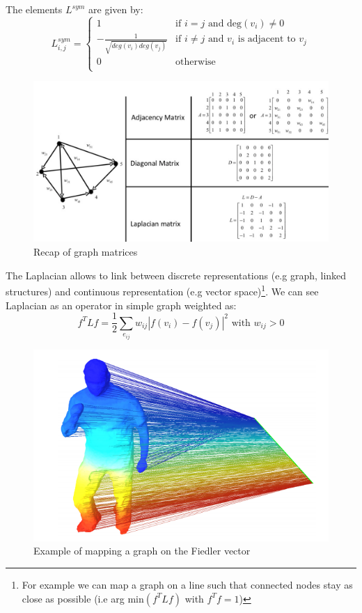 \documentclass{report}
\begin{document}
The elements $L^{sym}$ are given by:
\begin{equation}
L^{sym}_{i,j}= 
\begin{cases}
1 & \text{if $i=j$ and deg$(v_i) \neq 0$}\\
-\tfrac{1}{\sqrt{deg(v_i)deg(v_j)}} &\text{if $i \neq j$ and $v_i$ is adjacent to $v_j$}\\
0 &\text{otherwise}\\
\end{cases}
\end{equation}
\begin{figure}[htbp]
\centering
\includegraphics[scale=0.2]{res_ALD2.png}
\caption{ Recap of graph matrices
\label{fig:map}}
\end{figure}
The Laplacian allows to link between discrete representations (e.g graph, linked structures) and continuous representation (e.g vector space)\footnote{For example we can map a graph on a line such that connected nodes stay as close as possible (i.e arg min$(f^T L f )$ with $f^Tf=1$)}.
We can see Laplacian as an operator in simple graph weighted as:
\[ f^T L f = \dfrac{1}{2}\sum_{e_{ij}} w_{ij}|f(v_i)-f(v_j)|^2    \text{            	with $w_{ij}>0$} \] 

\begin{figure}[htbp]
\centering
\includegraphics[scale=0.25]{map.png}
\caption{ Example of mapping a graph on the Fiedler vector
\label{fig:map}}
\end{figure}
\end{document}
